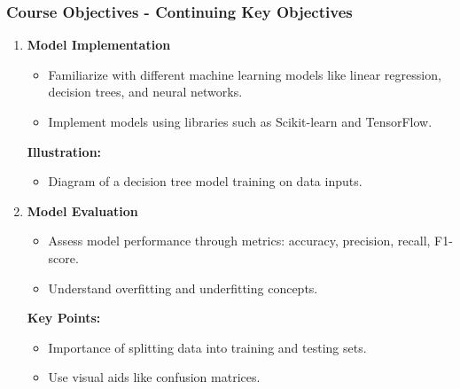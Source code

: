 \documentclass[aspectratio=169]{beamer}
\begin{document}
\begin{frame}
    \frametitle{Course Objectives - Continuing Key Objectives}
    \begin{enumerate}[resume]
        \item \textbf{Model Implementation}
            \begin{itemize}
                \item Familiarize with different machine learning models like linear regression, decision trees, and neural networks.
                \item Implement models using libraries such as Scikit-learn and TensorFlow.
            \end{itemize}
            
            \textbf{Illustration:}
            \begin{itemize}
                \item Diagram of a decision tree model training on data inputs.
            \end{itemize}
            
        \item \textbf{Model Evaluation}
            \begin{itemize}
                \item Assess model performance through metrics: accuracy, precision, recall, F1-score.
                \item Understand overfitting and underfitting concepts.
            \end{itemize}

            \textbf{Key Points:}
            \begin{itemize}
                \item Importance of splitting data into training and testing sets.
                \item Use visual aids like confusion matrices.
            \end{itemize}
    \end{enumerate}
\end{frame}
\end{document}

